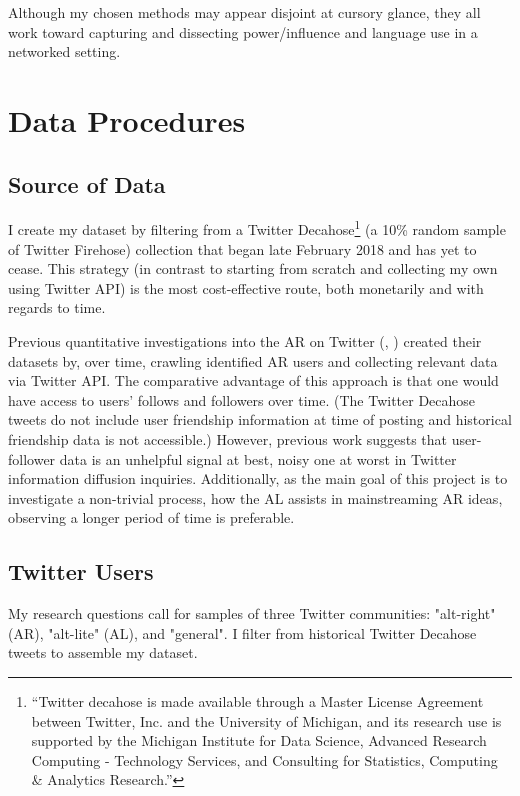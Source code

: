 \documentclass[acmlarge, screen, authorversion]{acmart}
\begin{document}
Although my chosen methods may appear disjoint at cursory glance, they all work toward capturing and dissecting power/influence and language use in a networked setting.  


\section{Data Procedures}

    \subsection{Source of Data}
    
    I create my dataset by filtering from a Twitter Decahose\footnote{“Twitter decahose is made available through a Master License Agreement between Twitter, Inc. and the University of Michigan, and its research use is supported by the Michigan Institute for Data Science, Advanced Research Computing - Technology Services, and Consulting for Statistics, Computing \& Analytics Research.”} (a 10\% random sample of Twitter Firehose) collection that began late February 2018 and has yet to cease. This strategy (in contrast to starting from scratch and collecting my own using Twitter API) is the most cost-effective route, both monetarily and with regards to time.

    Previous quantitative investigations into the AR on Twitter (\cite{bergerAltrightTwitterCensus2018}, \cite{alizadehPsychologyMoralityPolitical2019}) created their datasets by, over time, crawling identified AR users and collecting relevant data via Twitter API. The comparative advantage of this approach is that one would have access to users' follows and followers over time. (The Twitter Decahose tweets do not include user friendship information at time of posting and historical friendship data is not accessible.) However, previous work \cite{chaMeasuringUserInfluence2010, versteegInformationtheoreticMeasuresInfluence2013} suggests that user-follower data is an unhelpful signal at best, noisy one at worst in Twitter information diffusion inquiries. Additionally, as the main goal of this project is to investigate a non-trivial process, how the AL assists in mainstreaming AR ideas, observing a longer period of time is preferable. 

\subsection{Twitter Users}

My research questions call for samples of three Twitter communities: "alt-right" (AR), "alt-lite" (AL), and "general". I filter from historical Twitter Decahose tweets to assemble my dataset.
\end{document}
